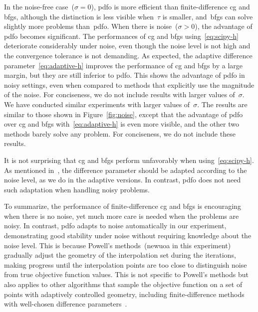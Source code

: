 \documentclass[smallextended,final]{svjour3}
\newcommand{\modified}[1]{\texorpdfstring{{\color{RoyalBlue}#1}}{#1}}
\begin{document}
In the noise-free case~($\sigma = 0$), \gls{pdfo} is more efficient than finite-difference \gls{cg} and \gls{bfgs}, although the distinction is less visible when~$\tau$ is smaller, and~\gls{bfgs} can solve slightly more problems than~\gls{pdfo}.
When there is noise~($\sigma >0$), the advantage of \gls{pdfo} becomes significant.
The performances of \gls{cg} and \gls{bfgs} \modified{using~\eqref{eq:scipy-h}} deteriorate considerably under noise, even \modified{though} the noise level is not high and the convergence tolerance is not demanding.
\modified{
    As expected, the adaptive difference parameter~\eqref{eq:adaptive-h} improves the performance of \gls{cg} and \gls{bfgs} by a large margin, but they are still inferior to \gls{pdfo}.
    This shows the advantage of \gls{pdfo} in noisy settings, even when compared to methods that explicitly use the magnitude of the noise.
}
\modified{For conciseness,} we do not include results with larger values of~$\sigma$.
\modified{%
    We have conducted similar experiments with larger values of~$\sigma$.
    The results are similar to those shown in Figure~\ref{fig:noise}, except that the advantage of \gls{pdfo} over \gls{cg} and \gls{bfgs} with~\eqref{eq:adaptive-h} is even more visible, and the other two methods barely solve any problem.
    For conciseness, we do not include these results.
}

\modified{
    It is not surprising that \gls{cg} and \gls{bfgs} perform unfavorably when using~\eqref{eq:scipy-h}.
    As mentioned in~\cite{More_Wild_2012,Shi_Etal_2022a,Shi_Etal_2023}, the difference parameter \modified{should} be adapted according to the noise level, as we do in the adaptive versions.
    In contrast, \gls{pdfo} does not need such adaptation when handling noisy problems.
}

To summarize, the performance of finite-difference \gls{cg} and \gls{bfgs} is encouraging when there is no noise, yet much more care is needed when the problems are noisy.
In contrast, \gls{pdfo} adapts to noise automatically in our experiment, demonstrating good stability under noise without requiring knowledge about the noise level.
This is because Powell's methods~(\gls{newuoa} in this experiment) gradually adjust the geometry of the interpolation set during the iterations, making progress until the interpolation points are too close to distinguish noise from true objective function values.
This is not specific to Powell's methods but also applies to other algorithms that sample the objective function on a set of points with adaptively controlled geometry, including finite-difference methods with well-chosen difference parameters~\cite{Shi_Etal_2022a}.
\end{document}
